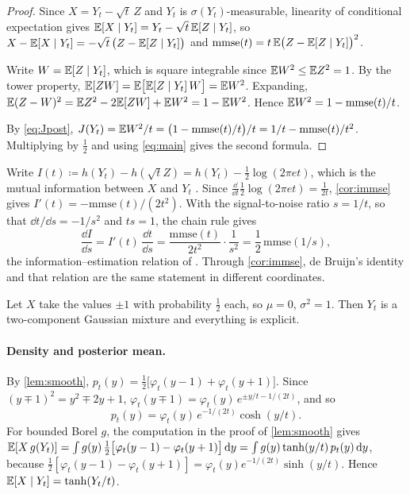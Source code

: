 \documentclass{saim-blog}
\begin{document}
\begin{proof}
Since $X=Y_t-\sqrt t\,Z$ and $Y_t$ is $\sigma(Y_t)$-measurable, linearity of conditional expectation gives $\mathbb{E}[X\mid Y_t]=Y_t-\sqrt t\,\mathbb{E}[Z\mid Y_t]$, so $X-\mathbb{E}[X\mid Y_t]=-\sqrt t\,\big(Z-\mathbb{E}[Z\mid Y_t]\big)$ and $\mathrm{mmse}(t)=t\,\mathbb{E}\big(Z-\mathbb{E}[Z\mid Y_t]\big)^2$.

Write $W=\mathbb{E}[Z\mid Y_t]$, which is square integrable since $\mathbb{E} W^2\le\mathbb{E} Z^2=1$. By the tower property, $\mathbb{E}[ZW]=\mathbb{E}\big[\mathbb{E}[Z\mid Y_t]\,W\big]=\mathbb{E} W^2$. Expanding, $\mathbb{E}(Z-W)^2=\mathbb{E} Z^2-2\mathbb{E}[ZW]+\mathbb{E} W^2=1-\mathbb{E} W^2$. Hence $\mathbb{E} W^2=1-\mathrm{mmse}(t)/t$.

By \eqref{eq:Jpost}, $J(Y_t)=\mathbb{E} W^2/t=\big(1-\mathrm{mmse}(t)/t\big)/t=1/t-\mathrm{mmse}(t)/t^2$. Multiplying by $\tfrac12$ and using \eqref{eq:main} gives the second formula.
\end{proof}
Write $I(t)\coloneqq h(Y_t)-h(\sqrt tZ)=h(Y_t)-\tfrac12\log(2\pi et)$, which is the mutual information between $X$ and $Y_t$ \citep[not proved here; see][]{guo2005}. Since $\frac{\dd}{\dd t}\tfrac12\log(2\pi et)=\frac1{2t}$, \cref{cor:immse} gives $I'(t)=-\mathrm{mmse}(t)/(2t^2)$. With the signal-to-noise ratio $s=1/t$, so that $\dd t/\dd s=-1/s^2$ and $ts=1$, the chain rule gives
\[
\frac{\dd I}{\dd s}=I'(t)\,\frac{\dd t}{\dd s}=\frac{\mathrm{mmse}(t)}{2t^2}\cdot\frac1{s^2}=\frac12\,\mathrm{mmse}(1/s),
\]
the information--estimation relation of \citet{guo2005}. Through \cref{cor:immse}, de Bruijn's identity and that relation are the same statement in different coordinates.

\SecExample

Let $X$ take the values $\pm1$ with probability $\tfrac12$ each, so $\mu=0$, $\sigma^2=1$. Then $Y_t$ is a two-component Gaussian mixture and everything is explicit.

\paragraph{Density and posterior mean.}
By \cref{lem:smooth}, $p_t(y)=\tfrac12\big[\varphi_t(y-1)+\varphi_t(y+1)\big]$. Since $(y\mp1)^2=y^2\mp2y+1$, $\varphi_t(y\mp1)=\varphi_t(y)\,e^{\pm y/t-1/(2t)}$, and so
\[
p_t(y)=\varphi_t(y)\,e^{-1/(2t)}\cosh(y/t).
\]
For bounded Borel $g$, the computation in the proof of \cref{lem:smooth} gives $\mathbb{E}[X\,g(Y_t)]=\int g(y)\,\tfrac12\big[\varphi_t(y-1)-\varphi_t(y+1)\big]\mathop{}\!\mathrm{d} y=\int g(y)\tanh(y/t)\,p_t(y)\mathop{}\!\mathrm{d} y$, because $\tfrac12[\varphi_t(y-1)-\varphi_t(y+1)]=\varphi_t(y)e^{-1/(2t)}\sinh(y/t)$. Hence $\mathbb{E}[X\mid Y_t]=\tanh(Y_t/t)$.
\end{document}
